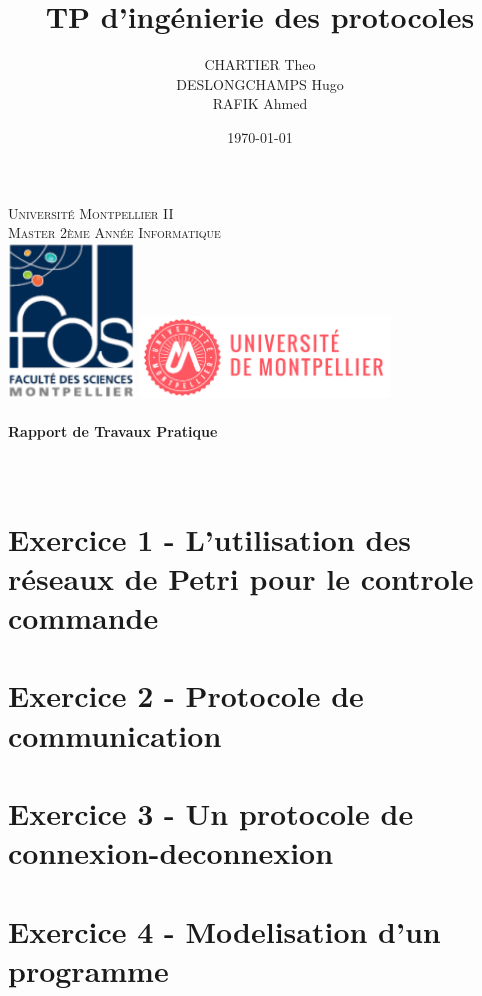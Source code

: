 \documentclass[]{article}
\title{TP d'ingénierie des protocoles}
\author{
  CHARTIER Theo \\
  DESLONGCHAMPS Hugo \\
  RAFIK Ahmed}
\date\today
\begin{document}
\makeatletter
  \begin{titlepage}
    \centering
        {\large \textsc{Université Montpellier II}}\\
        \textsc{Master 2ème Année Informatique}\\
        \vspace{1cm}
        \includegraphics[width=0.25\textwidth]{images/logo.png}
        \hfill
        \includegraphics[width=0.5\textwidth]{images/logo2.png}\\
        \vspace{1cm}
               {\large\textbf{	\@date\\
                   Rapport de Travaux Pratique}}\\
               \vfill
                   {\LARGE \textbf{\@title}} \\
                   \vspace{2em}
                          {\large \@author} \\
                          \vfill
  \end{titlepage}
\makeatother

\section{Exercice 1 - L'utilisation des réseaux de Petri pour le controle commande}

\section{Exercice 2 - Protocole de communication}

\section{Exercice 3 - Un protocole de connexion-deconnexion}

\section{Exercice 4 - Modelisation d'un programme}

\end{document}
